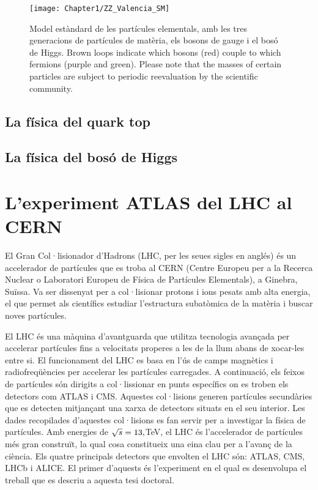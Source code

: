 \begin{figure}
 	 \centering
 	  \texttt{[image: Chapter1/ZZ\_Valencia\_SM]}
	  \caption{Model estàndard de les partícules elementals, amb les tres generacions de partícules de 
	  matèria, els bosons de gauge i el bosó de Higgs. Brown loops indicate which bosons (red) couple 
	  to which fermions (purple and green). Please note that the masses of certain particles are subject 
	  to periodic reevaluation by the scientific community.} 
	\label{fig:resumen_val:Teoria:SM}
\end{figure}


\subsection{La física del quark top}
\subsection{La física del bosó de Higgs}

\section{L'experiment ATLAS del LHC al CERN}
\label{chap:resumen_val:Exp}
El Gran Col·lisionador d'Hadrons (LHC, per les seues sigles en anglés) és un accelerador de partícules que es troba 
al CERN (Centre Europeu per a la Recerca Nuclear o Laboratori Europeu de Física de Partícules Elementals), a 
Ginebra, Suïssa. Va ser dissenyat per a col·lisionar protons i ions pesats amb alta energia, el que permet als científics 
estudiar l'estructura subatòmica de la matèria i buscar noves partícules.

El LHC és una màquina d'avantguarda que utilitza tecnologia avançada per accelerar partícules fins a velocitats 
properes a les de la llum abans de xocar-les entre si. El funcionament 
del LHC es basa en l'ús de camps magnètics i radiofreqüències per accelerar les partícules carregades.
A continuació, els feixos de partícules són dirigits a col·lissionar en punts específics on es troben els detectors 
com ATLAS i CMS.
Aquestes col·lisions generen partícules secundàries que es 
detecten mitjançant una xarxa de detectors situats en el seu interior. Les dades recopilades d'aquestes col·lisions 
es fan servir per a investigar la física de partícules. Amb energies de $\sqrt{s} = 13,$TeV, el LHC és l'accelerador de 
partícules més gran construït, la qual cosa constitueix una eina clau per a l'avanç de la ciència. 
Els quatre principals detectors que envolten el LHC són: ATLAS, CMS, LHCb i ALICE. 
El primer d'aquests és l'experiment en el qual es desenvolupa el treball que es descriu 
a aquesta tesi doctoral. 




